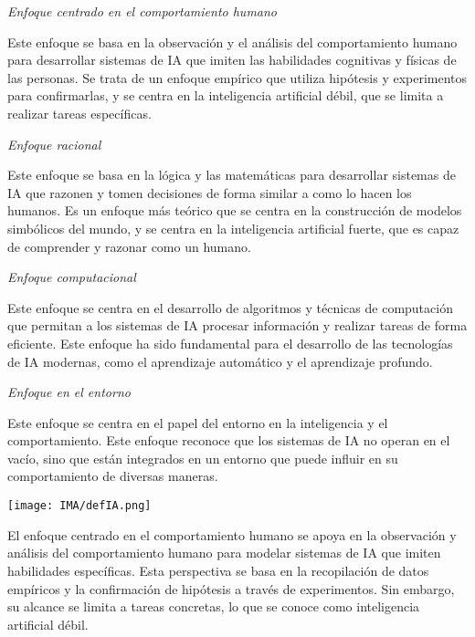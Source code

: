 \begin{myitemize}
    \item \textit{Enfoque centrado en el comportamiento humano}
    
    Este enfoque se basa en la observación y el análisis del comportamiento humano para desarrollar 
    sistemas de IA que imiten las habilidades cognitivas y físicas de las personas. Se trata de 
    un enfoque empírico que utiliza hipótesis y experimentos para confirmarlas, y se centra en la 
    inteligencia artificial débil, que se limita a realizar tareas específicas.

    \item \textit{Enfoque racional} 
    
    Este enfoque se basa en la lógica y las matemáticas para desarrollar 
    sistemas de IA que razonen y tomen decisiones de forma similar a como lo hacen los humanos. 
    Es un enfoque más teórico que se centra en la construcción de modelos simbólicos del mundo, 
    y se centra en la inteligencia artificial fuerte, que es capaz de comprender 
    y razonar como un humano.

    \item \textit{Enfoque computacional} 
    
    Este enfoque se centra en el desarrollo de algoritmos y técnicas de computación que permitan a 
    los sistemas de IA procesar información y realizar tareas de forma eficiente. Este enfoque ha 
    sido fundamental para el desarrollo de las tecnologías de IA modernas, como el 
    aprendizaje automático y el aprendizaje profundo.

    \item \textit{Enfoque en el entorno} 
    
    Este enfoque se centra en el papel del entorno en la inteligencia y el comportamiento. Este 
    enfoque reconoce que los sistemas de IA no operan en el vacío, sino que están integrados en 
    un entorno que puede influir en su comportamiento de diversas maneras.
\end{myitemize}

\begin{center}
    \texttt{[image: IMA/defIA.png]}    
\end{center}


El enfoque centrado en el comportamiento humano se apoya en la observación y análisis del comportamiento 
humano para modelar sistemas de IA que imiten habilidades específicas. Esta perspectiva se basa en la 
recopilación de datos empíricos y la confirmación de hipótesis a través de experimentos. Sin embargo, 
su alcance se limita a tareas concretas, lo que se conoce como inteligencia artificial débil.\\



